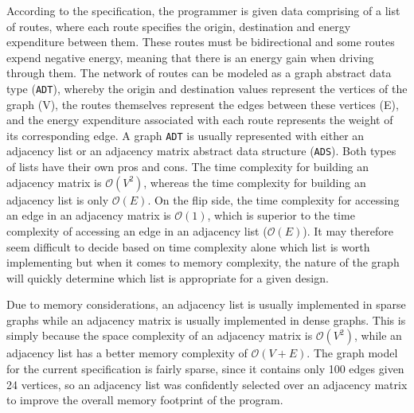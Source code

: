 \documentclass[11pt]{article}
\begin{document}
According to the specification, the programmer is given data comprising of a list of routes, where each route specifies the origin, destination and energy expenditure between them. These routes must be bidirectional and some routes expend negative energy, meaning that there is an energy gain when driving through them. The network of routes can be modeled as a graph abstract data type (\texttt{ADT}), whereby the origin and destination values represent the vertices of the graph (V), the routes themselves represent the edges between these vertices (E), and the energy expenditure associated with each route represents the weight of its corresponding edge. A graph \texttt{ADT} is usually represented with either an adjacency list or an adjacency matrix abstract data structure (\texttt{ADS}). Both types of lists have their own pros and cons. The time complexity for building an adjacency matrix is $\mathcal{O}(V^2)$, whereas the time complexity for building an adjacency list is only $\mathcal{O}(E)$\cite{Sedgewick}. On the flip side, the time complexity for accessing an edge in an adjacency matrix is $\mathcal{O}(1)$, which is superior to the time complexity of accessing an edge in an adjacency list ($\mathcal{O}(E)$)\cite{Sedgewick}. It may therefore seem difficult to decide based on time complexity alone which list is worth implementing but when it comes to memory complexity, the nature of the graph will quickly determine which list is appropriate for a given design.

Due to memory considerations, an adjacency list is usually implemented in sparse graphs while an adjacency matrix is usually implemented in dense graphs. This is simply because the space complexity of an adjacency matrix is $\mathcal{O}(V^2)$, while an adjacency list has a better memory complexity of $\mathcal{O}(V + E)$\cite{Sedgewick}. The graph model for the current specification is fairly sparse, since it contains only 100 edges given 24 vertices, so an adjacency list was confidently selected over an adjacency matrix to improve the overall memory footprint of the program.
\end{document}
